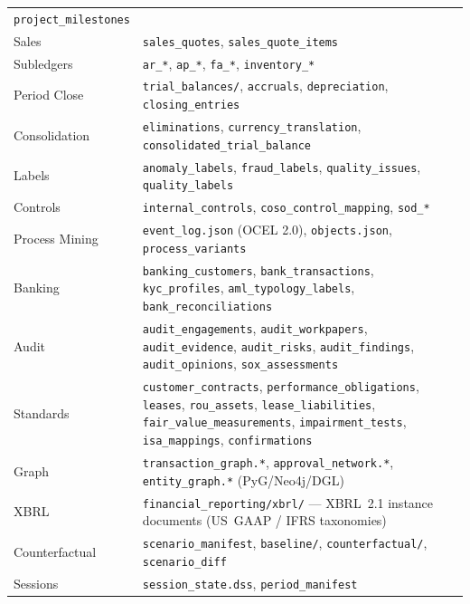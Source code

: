 \begin{table}[ht]
\begin{tabular}{lp{9cm}}
  \texttt{project\_milestones} \\
Sales &
  \texttt{sales\_quotes}, \texttt{sales\_quote\_items} \\
Subledgers &
  \texttt{ar\_*}, \texttt{ap\_*}, \texttt{fa\_*},
  \texttt{inventory\_*} \\
Period Close &
  \texttt{trial\_balances/}, \texttt{accruals},
  \texttt{depreciation}, \texttt{closing\_entries} \\
Consolidation &
  \texttt{eliminations}, \texttt{currency\_translation},
  \texttt{consolidated\_trial\_balance} \\
Labels &
  \texttt{anomaly\_labels}, \texttt{fraud\_labels},
  \texttt{quality\_issues}, \texttt{quality\_labels} \\
Controls &
  \texttt{internal\_controls}, \texttt{coso\_control\_mapping},
  \texttt{sod\_*} \\
Process Mining &
  \texttt{event\_log.json} (OCEL 2.0), \texttt{objects.json},
  \texttt{process\_variants} \\
Banking &
  \texttt{banking\_customers}, \texttt{bank\_transactions},
  \texttt{kyc\_profiles}, \texttt{aml\_typology\_labels},
  \texttt{bank\_reconciliations} \\
Audit &
  \texttt{audit\_engagements}, \texttt{audit\_workpapers},
  \texttt{audit\_evidence}, \texttt{audit\_risks},
  \texttt{audit\_findings}, \texttt{audit\_opinions},
  \texttt{sox\_assessments} \\
Standards &
  \texttt{customer\_contracts}, \texttt{performance\_obligations},
  \texttt{leases}, \texttt{rou\_assets}, \texttt{lease\_liabilities},
  \texttt{fair\_value\_measurements}, \texttt{impairment\_tests},
  \texttt{isa\_mappings}, \texttt{confirmations} \\
Graph &
  \texttt{transaction\_graph.*}, \texttt{approval\_network.*},
  \texttt{entity\_graph.*} (PyG/Neo4j/DGL) \\
XBRL &
  \texttt{financial\_reporting/xbrl/} --- XBRL~2.1 instance documents
  (US~GAAP / IFRS taxonomies) \\
Counterfactual &
  \texttt{scenario\_manifest}, \texttt{baseline/},
  \texttt{counterfactual/}, \texttt{scenario\_diff} \\
Sessions &
  \texttt{session\_state.dss}, \texttt{period\_manifest} \\
\bottomrule
\end{tabular}
\end{table}

